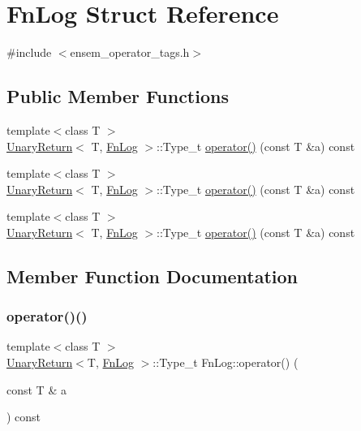 \hypertarget{structFnLog}{}\section{Fn\+Log Struct Reference}
\label{structFnLog}


{\ttfamily \#include $<$ensem\+\_\+operator\+\_\+tags.\+h$>$}

\subsection*{Public Member Functions}
\begin{DoxyCompactItemize}
\item 
{\footnotesize template$<$class T $>$ }\\\mbox{\hyperlink{structUnaryReturn}{Unary\+Return}}$<$ T, \mbox{\hyperlink{structFnLog}{Fn\+Log}} $>$\+::Type\+\_\+t \mbox{\hyperlink{structFnLog_a888c66c42f3d71caf35dd0d0cf80d6fb}{operator()}} (const T \&a) const
\item 
{\footnotesize template$<$class T $>$ }\\\mbox{\hyperlink{structUnaryReturn}{Unary\+Return}}$<$ T, \mbox{\hyperlink{structFnLog}{Fn\+Log}} $>$\+::Type\+\_\+t \mbox{\hyperlink{structFnLog_a888c66c42f3d71caf35dd0d0cf80d6fb}{operator()}} (const T \&a) const
\item 
{\footnotesize template$<$class T $>$ }\\\mbox{\hyperlink{structUnaryReturn}{Unary\+Return}}$<$ T, \mbox{\hyperlink{structFnLog}{Fn\+Log}} $>$\+::Type\+\_\+t \mbox{\hyperlink{structFnLog_a888c66c42f3d71caf35dd0d0cf80d6fb}{operator()}} (const T \&a) const
\end{DoxyCompactItemize}


\subsection{Member Function Documentation}
\mbox{\label{structFnLog_a888c66c42f3d71caf35dd0d0cf80d6fb}} 
\subsubsection{\texorpdfstring{operator()()}{operator()()}\hspace{0.1cm}{\footnotesize\ttfamily [1/3]}}
{\footnotesize\ttfamily template$<$class T $>$ \\
\mbox{\hyperlink{structUnaryReturn}{Unary\+Return}}$<$T, \mbox{\hyperlink{structFnLog}{Fn\+Log}} $>$\+::Type\+\_\+t Fn\+Log\+::operator() (\begin{DoxyParamCaption}\item[{const T \&}]{a }\end{DoxyParamCaption}) const\hspace{0.3cm}{\ttfamily [inline]}}


